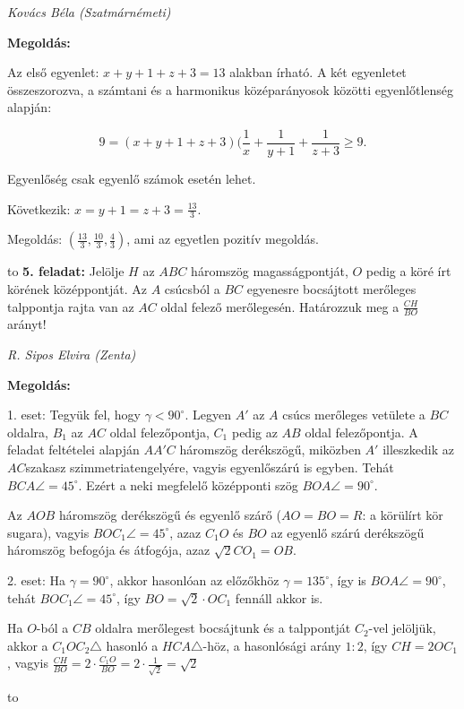 \documentclass[a4paper,10pt]{article}
\def\ki#1#2{\hfill {\it #1 (#2)}\medskip}
\begin{document}
\ki{Kovács Béla}{Szatmárnémeti}

{\bf Megoldás:}

Az első egyenlet: $x+y+1+z+3=13$ alakban írható. \*
A két egyenletet összeszorozva, a számtani és a harmonikus középarányosok közötti egyenlőtlenség alapján:

$$9=(x+y+1+z+3)(\frac{1}{x}+\frac{1}{y+1}+\frac{1}{z+3}\ge 9.$$
  
Egyenlőség csak egyenlő számok esetén lehet.

Következik: $x=y+1=z+3=\frac{13}{3}$.

Megoldás: $(\frac{13}{3}, \frac{10}{3}, \frac43)$, ami az egyetlen pozitív megoldás.

\medskip
\hbox to 
{\bf 5. feladat:} Jelölje $H$ az $ABC$ háromszög magasságpontját, $O$ pedig a köré írt körének középpontját. Az $A$ csúcsból a $BC$ egyenesre bocsájtott merőleges talppontja rajta van az $AC$ oldal felező merőlegesén. Határozzuk meg a $\frac{CH}{BO}$ arányt!

\ki{R. Sipos Elvira} {Zenta}

{\bf Megoldás:}

1. eset: Tegyük fel, hogy $\gamma<90^{\circ}$. Legyen $A'$ az $A$ csúcs merőleges vetülete a $BC$ oldalra, $B_1$ az $AC$ oldal felezőpontja, $C_1$ pedig az $AB$ oldal felezőpontja. A feladat feltételei alapján $AA'C$ háromszög derékszögű, miközben $A'$ illeszkedik az $AC$szakasz szimmetriatengelyére, vagyis egyenlőszárú is egyben. Tehát $BCA\angle=45^{\circ}$. Ezért a neki megfelelő középponti szög $BOA\angle=90^{\circ}$.

Az $AOB$ háromszög derékszögű és egyenlő szárő ($AO=BO=R$: a körülírt kör sugara), vagyis $BOC_1\angle=45^{\circ}$, azaz $C_1O$ és $BO$ az egyenlő szárú derékszögű háromszög befogója és átfogója, azaz $\sqrt{2}CO_1=OB$.

2. eset: Ha $\gamma=90^{\circ}$, akkor hasonlóan az előzőkhöz $\gamma=135^{\circ}$, így is $BOA\angle=90^{\circ}$, tehát $BOC_1\angle=45^{\circ}$, így $BO=\sqrt{2}\cdot OC_1$ fennáll akkor is.

Ha $O$-ból a $CB$ oldalra merőlegest bocsájtunk és a talppontját $C_2$-vel jelöljük, akkor a $C_1OC_2\triangle$ hasonló a $HCA\triangle$-höz, a hasonlósági arány $1:2$, így $CH=2OC_1$, vagyis $\frac{CH}{BO}=2\cdot\frac{C_1O}{BO}=2\cdot \frac{1}{\sqrt{2}}=\sqrt2$

\medskip
\hbox to 
\end{document}
